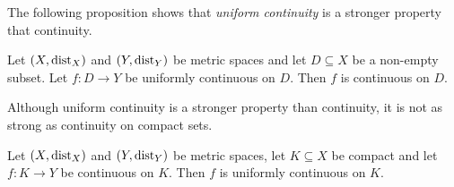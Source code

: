 The following proposition shows that \emph{uniform continuity} is a stronger property that continuity.

\begin{proposition}
    Let $(X, \text{dist}_X)$ and $(Y, \text{dist}_Y)$ be metric spaces and let $D \subseteq X$ be a non-empty subset. Let $f: D \to Y$
    be uniformly continuous on $D$. Then $f$ is continuous on $D$.
\end{proposition}

Although uniform continuity is a stronger property than continuity, it is not as strong as continuity on compact sets.
\begin{theorem}
    Let $(X, \text{dist}_X)$ and $(Y, \text{dist}_Y)$ be metric spaces, let $K \subseteq X$ be compact and let $f: K \to Y$ be
    continuous on $K$. Then $f$ is uniformly continuous on $K$.
\end{theorem}
